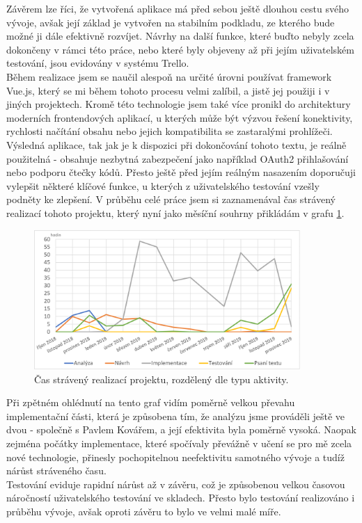 \begin{conclusion} \label{conclusion}

Závěrem lze říci, že vytvořená aplikace má před sebou ještě dlouhou cestu svého vývoje, avšak její základ je vytvořen na stabilním podkladu, ze kterého bude možné ji dále efektivně rozvíjet. Návrhy na další funkce, které buďto nebyly zcela dokončeny v rámci této práce, nebo které byly objeveny až při jejím uživatelském testování, jsou evidovány v systému Trello.\\
Během realizace jsem se naučil alespoň na určité úrovni používat framework Vue.js, který se mi během tohoto procesu velmi zalíbil, a jistě jej použiji i v jiných projektech. Kromě této technologie jsem také více pronikl do architektury moderních frontendových aplikací, u kterých může být výzvou řešení konektivity, rychlosti načítání obsahu nebo jejich kompatibilita se zastaralými prohlížeči.\\
Výsledná aplikace, tak jak je k dispozici při dokončování tohoto textu, je reálně použitelná - obsahuje nezbytná zabezpečení jako například OAuth2 přihlašování nebo podporu čtečky kódů. Přesto ještě před jejím reálným nasazením doporučuji vylepšit některé klíčové funkce, u kterých z uživatelského testování vzešly podněty ke zlepšení.
V průběhu celé práce jsem si zaznamenával čas strávený realizací tohoto projektu, který nyní jako měsíční souhrny přikládám v grafu \ref{picture:time:spent}.

\begin{figure}[H]
\includegraphics[width=0.9\textwidth]{../png/time/time_spent.png}
\caption[Měsíční čas strávený realizací projektu]{Čas strávený realizací projektu, rozdělený dle typu aktivity.} \label{picture:time:spent}
\end{figure}

Při zpětném ohlédnutí na tento graf vidím poměrně velkou převahu implementační části, která je způsobena tím, že analýzu jsme prováděli ještě ve dvou - společně s Pavlem Kovářem, a její efektivita byla poměrně vysoká. Naopak zejména počátky implementace, které spočívaly převážně v učení se pro mě zcela nové technologie, přinesly pochopitelnou neefektivitu samotného vývoje a tudíž nárůst stráveného času.\\
Testování eviduje rapidní nárůst až v závěru, což je způsobenou velkou časovou náročností uživatelského testování ve skladech. Přesto bylo testování realizováno i průběhu vývoje, avšak oproti závěru to bylo ve velmi malé míře.\\

\end{conclusion}
